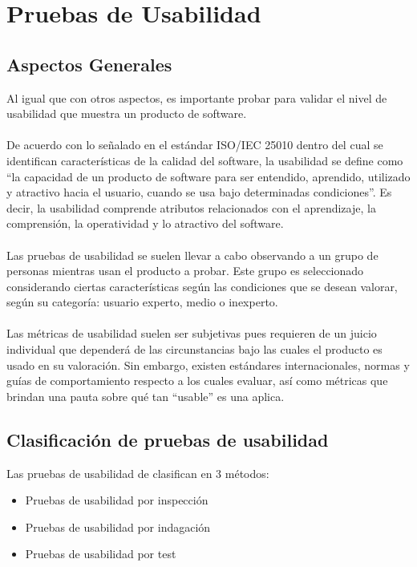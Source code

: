 \newpage
\chapter{Pruebas de Usabilidad}
\section{Aspectos Generales}
Al igual que con otros aspectos, es importante probar para validar el nivel de usabilidad que muestra un producto de software.\\ \\

De acuerdo con lo señalado en el estándar ISO/IEC 25010 dentro del cual se identifican características de la calidad del software, la usabilidad se define como “la capacidad de un producto de software para ser entendido, aprendido, utilizado y atractivo hacia el usuario, cuando se usa bajo determinadas condiciones”. Es decir, la usabilidad comprende atributos relacionados con el aprendizaje, la comprensión, la operatividad y lo atractivo del software. \\ \\

Las pruebas de usabilidad se suelen llevar a cabo observando a un grupo de personas mientras usan el producto a probar. Este grupo es seleccionado considerando ciertas características según las condiciones que se desean valorar, según su categoría: usuario experto, medio o inexperto. \\ \\ 

Las métricas de usabilidad suelen ser subjetivas pues requieren de un juicio individual que dependerá de las circunstancias bajo las cuales el producto es usado en su valoración. Sin embargo, existen estándares internacionales, normas y guías de comportamiento respecto a los cuales evaluar, así como métricas que brindan una pauta sobre qué tan “usable” es una aplica.

\section{Clasificación de pruebas de usabilidad}
Las pruebas de usabilidad de clasifican en 3 métodos:
\begin{itemize}
\item Pruebas de usabilidad por inspección
\item Pruebas de usabilidad por indagación
\item Pruebas de usabilidad por test
\end{itemize}

